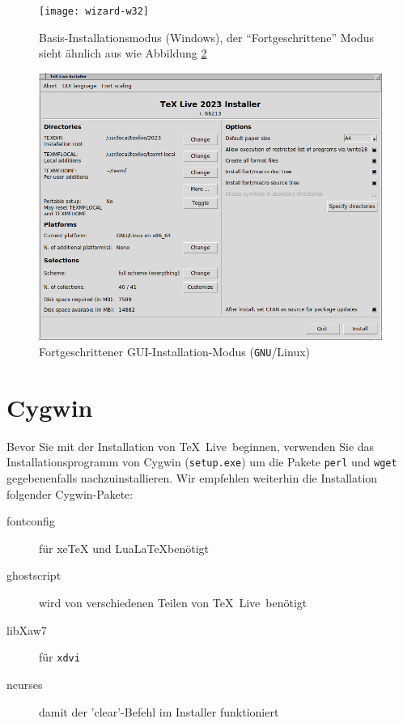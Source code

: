 \documentclass[12pt,ngerman,a4paper,fullparskip]{report}
\newcommand{\TL}{\TeX\ Live\xspace}
\newcommand{\acro}[1]{\texttt{#1}}
\newcommand{\code}[1]{\texttt{#1}}
\newcommand{\filename}[1]{\texttt{#1}}
\providecommand*{\GNU}{\acro{GNU}\xspace}
\providecommand*{\XeTeX}{xe\TeX\xspace}
\begin{document}
\begin{figure}[tb]
\texttt{[image: wizard-w32]}
\caption{Basis-Installationsmodus (Windows), der \enquote{Fortgeschrittene} Modus sieht ähnlich aus wie Abbildung
\ref{fig:advanced-lnx}}\label{fig:wizard-w32}
\end{figure}


\begin{figure}[tb]
\includegraphics[width={\linewidth}]{advanced-lnx}
\caption{Fortgeschrittener GUI-Installation-Modus (\GNU/Linux)}\label{fig:advanced-lnx}
\end{figure}

\section{Cygwin}\label{sec:cygwin}

Bevor Sie mit der Installation von \TL\ beginnen, verwenden Sie das
Installationsprogramm von Cygwin (\filename{setup.exe}) um die Pakete
\filename{perl} und \filename{wget} gegebenenfalls nachzuinstallieren.
Wir empfehlen weiterhin die Installation folgender Cygwin-Pakete:

\begin{description}
\item[fontconfig] für \XeTeX und Lua\LaTeX benötigt
\item[ghostscript] wird von verschiedenen Teilen von \TL\ benötigt
\item[libXaw7] für \code{xdvi}
\item[ncurses] damit der 'clear'-Befehl im Installer funktioniert
\end{description}
\end{document}
